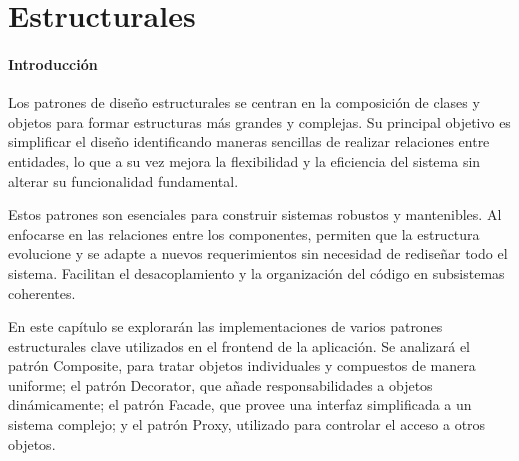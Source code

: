 \chapter{Estructurales}
\subsubsection{Introducción}{
    Los patrones de diseño estructurales se centran en la composición de clases y objetos para formar estructuras más grandes y complejas. Su principal objetivo es simplificar el diseño identificando maneras sencillas de realizar relaciones entre entidades, lo que a su vez mejora la flexibilidad y la eficiencia del sistema sin alterar su funcionalidad fundamental.

    Estos patrones son esenciales para construir sistemas robustos y mantenibles. Al enfocarse en las relaciones entre los componentes, permiten que la estructura evolucione y se adapte a nuevos requerimientos sin necesidad de rediseñar todo el sistema. Facilitan el desacoplamiento y la organización del código en subsistemas coherentes.

    En este capítulo se explorarán las implementaciones de varios patrones estructurales clave utilizados en el frontend de la aplicación. Se analizará el patrón Composite, para tratar objetos individuales y compuestos de manera uniforme; el patrón Decorator, que añade responsabilidades a objetos dinámicamente; el patrón Facade, que provee una interfaz simplificada a un sistema complejo; y el patrón Proxy, utilizado para controlar el acceso a otros objetos.
}



